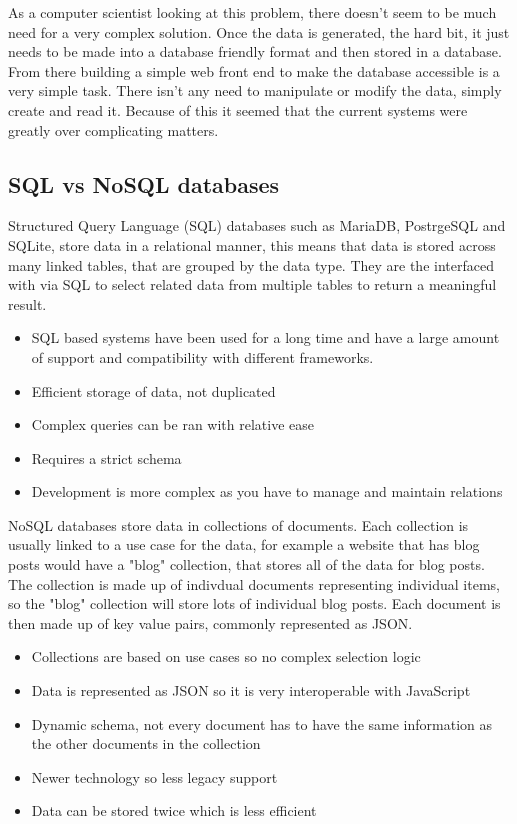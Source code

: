 As a computer scientist looking at this problem, there doesn't seem to be much need for a very complex solution. Once the data is generated, the hard bit, it just needs to be made into a database friendly format and then stored in a database. From there building a simple web front end to make the database accessible is a very simple task. There isn't any need to manipulate or modify the data, simply create and read it. Because of this it seemed that the current systems were greatly over complicating matters.

  \subsection{SQL vs NoSQL databases}

  Structured Query Language (SQL) databases such as MariaDB, PostrgeSQL and SQLite, store data in a relational manner, this means that data is stored across many linked tables, that are grouped by the data type. They are the interfaced with via SQL to select related data from multiple tables to return a meaningful result. 
  
  \begin{itemize}
    \item SQL based systems have been used for a long time and have a large amount of support and compatibility with different frameworks. 
    \item Efficient storage of data, not duplicated
    \item Complex queries can be ran with relative ease
    \item Requires a strict schema 
    \item Development is more complex as you have to manage and maintain relations
  \end{itemize}

  NoSQL databases store data in collections of documents. Each collection is usually linked to a use case for the data, for example a website that has blog posts would have a "blog" collection, that stores all of the data for blog posts. The collection is made up of indivdual documents representing individual items, so the "blog" collection will store lots of individual blog posts. Each document is then made up of key value pairs, commonly represented as JSON. 

  \begin{itemize}
    \item Collections are based on use cases so no complex selection logic
    \item Data is represented as JSON so it is very interoperable with JavaScript
    \item Dynamic schema, not every document has to have the same information as the other documents in the collection
    \item Newer technology so less legacy support
    \item Data can be stored twice which is less efficient
  \end{itemize}

